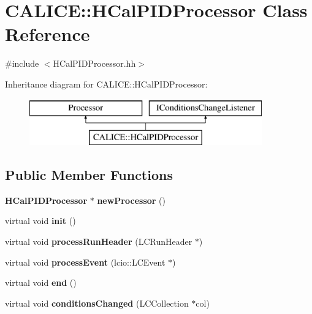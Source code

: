\section{C\-A\-L\-I\-C\-E\-:\-:H\-Cal\-P\-I\-D\-Processor Class Reference}
\label{classCALICE_1_1HCalPIDProcessor}


{\ttfamily \#include $<$H\-Cal\-P\-I\-D\-Processor.\-hh$>$}

Inheritance diagram for C\-A\-L\-I\-C\-E\-:\-:H\-Cal\-P\-I\-D\-Processor\-:\begin{figure}[H]
\begin{center}
\leavevmode
\includegraphics[height=2.000000cm]{classCALICE_1_1HCalPIDProcessor}
\end{center}
\end{figure}
\subsection*{Public Member Functions}
\begin{DoxyCompactItemize}
\item 
{\bf H\-Cal\-P\-I\-D\-Processor} $\ast$ {\bfseries new\-Processor} ()\label{classCALICE_1_1HCalPIDProcessor_a166876f43ec7460b93882ba213d0cda2}

\item 
virtual void {\bfseries init} ()\label{classCALICE_1_1HCalPIDProcessor_a04c4550bdb0d8c12c76b682b37040e51}

\item 
virtual void {\bfseries process\-Run\-Header} (L\-C\-Run\-Header $\ast$)\label{classCALICE_1_1HCalPIDProcessor_ac2e967d5379413aba6e11fa757cb7e06}

\item 
virtual void {\bfseries process\-Event} (lcio\-::\-L\-C\-Event $\ast$)\label{classCALICE_1_1HCalPIDProcessor_ae41234eddfd428a90e4cf192ce2d03e3}

\item 
virtual void {\bfseries end} ()\label{classCALICE_1_1HCalPIDProcessor_a8f03caf555f25eb7bc4171a6c6724253}

\item 
virtual void {\bf conditions\-Changed} (L\-C\-Collection $\ast$col)
\end{DoxyCompactItemize}


